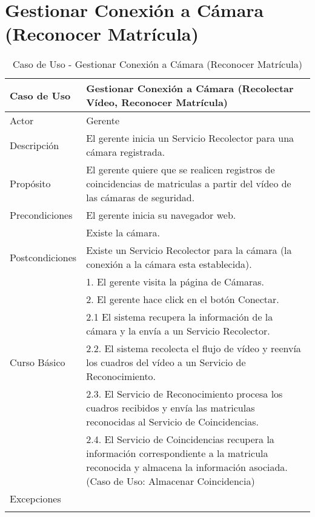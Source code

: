 \section{Gestionar Conexión a Cámara (Reconocer Matrícula)}

    \begin{longtable}{@{} p{3cm} p{10cm} @{}} \toprule
    \textbf{Caso de Uso}    & Gestionar Conexión a Cámara (Recolectar Vídeo, Reconocer Matrícula) \\ \midrule
    Actor                   & Gerente \\ \cmidrule{1-2}
    Descripción             & El gerente inicia un Servicio Recolector para una cámara registrada. \\ \cmidrule{1-2}
    Propósito               & El gerente quiere que se realicen registros de coincidencias de matriculas a partir del vídeo de las cámaras de seguridad. \\ \cmidrule{1-2}
    Precondiciones          & El gerente inicia su navegador web. \\ 
                            & Existe la cámara. \\ \cmidrule{1-2} 
    Postcondiciones         & Existe un Servicio Recolector para la cámara (la conexión a la cámara esta establecida). \\ \cmidrule{1-2} 
                            & 1. El gerente visita la página de Cámaras. \\ 
                            & 2. El gerente hace click en el botón Conectar. \\
                            & 2.1 El sistema recupera la información de la cámara y la envía a un Servicio Recolector. \\
    Curso Básico            & 2.2. El sistema recolecta el flujo de vídeo y reenvía los cuadros del vídeo a un Servicio de Reconocimiento. \\
                            & 2.3. El Servicio de Reconocimiento procesa los cuadros recibidos y envía  las matriculas reconocidas al Servicio de Coincidencias. \\
                            & 2.4. El Servicio de Coincidencias recupera la información correspondiente a la matricula reconocida y almacena la información asociada. (Caso de Uso: Almacenar Coincidencia) \\ \cmidrule{1-2}
    Excepciones             & \\ \bottomrule
   \caption{Caso de Uso - Gestionar Conexión a Cámara (Reconocer Matrícula)} \label{tab:tabcu-rec}  \\
   \end{longtable}
       

